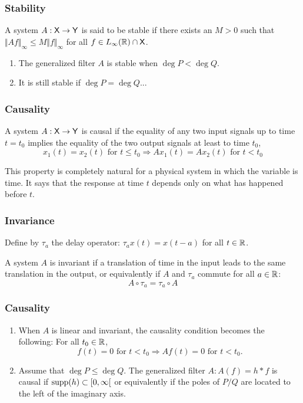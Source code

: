 \begin{frame}
\frametitle{Stability}
\begin{definition}
A system $A: \mathsf{X} \to \mathsf{Y}$ is said to be \alert{stable} if there exists an $M>0$ such that $\Vert Af\Vert_{\infty}\leq M\Vert f\Vert_{\infty}$ for all $f\in L_\infty(\mathbb{R})\cap \mathsf{X}$.
\end{definition}
\begin{enumerate}[label=(\roman*)]
\item The generalized filter $A$ is stable when $\deg P<\deg Q$.
\item It is still stable if $\deg P = \deg Q$... 
 \end{enumerate}
\end{frame}

\begin{frame}
\frametitle{Causality}
\begin{definition}
A system $A: \mathsf{X} \to \mathsf{Y}$ is \alert{causal} if the equality of any two input signals up to time $t=t_0$ implies the equality of the two output signals at least to time $t_0$,
$$
\text{$x_1(t)= x_2(t)$ for $t \leq t_0$} \Rightarrow \text{$A x_1(t)= A x_2(t)$ for $t < t_0$}  
$$
\end{definition}
This property is completely natural for a physical system in which the
variable is time. It says that the response at time $t$ depends only on what
has happened before $t$. 
\end{frame}

\begin{frame}
\frametitle{Invariance}
Define by $\tau_a$ the \alert{delay operator}: $\tau_a x(t)= x(t-a)$ for all $t \in \mathbb{R}$. 
\begin{definition}
A system $A$ is \alert{invariant} if a translation of time in the input leads to the same translation in the output, or equivalently 
if $A$ and $\tau_a$ commute for all $a \in \mathbb{R}$:
\[
A \circ \tau_a = \tau_a \circ A 
\]
\end{definition}
\end{frame}

\begin{frame}
\frametitle{Causality}
\begin{enumerate}[label=(\roman*)]
\item When $A$ is  linear and invariant, the causality condition becomes the following: 
For all $t_{0}\in \mathbb{R}$, 
$$
\text{$f(t)=0$ for $t<t_{0}\Rightarrow Af(t)=0$ for $t<t_{0}$.}
$$
\item Assume that $\deg P\leq\deg Q$. The generalized filter $A: A(f)= h * f$ is \alert{causal} if $\mathrm{supp}(h) \subset \left[0,\infty\right[$ or equivalently if the poles of $P/Q$ are located to the \alert{left of the imaginary axis}.
\end{enumerate}
\end{frame}


 